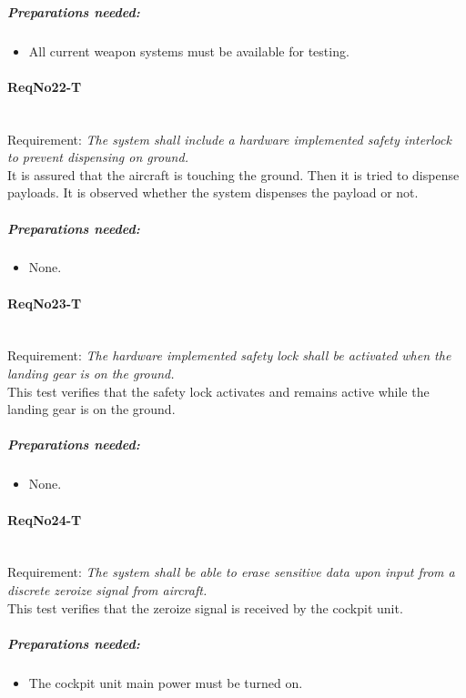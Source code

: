 	\subparagraph{Preparations needed:}
	\begin{itemize}
	\item All current weapon systems must be available for testing.
	\end{itemize} 
	

\paragraph{ReqNo22-T}\mbox{}\\ %
Requirement: \textit{The system shall include a hardware implemented safety interlock to prevent dispensing on ground.}
\\
It is assured that the aircraft is touching the ground. Then it is tried to dispense payloads. It is observed whether the system dispenses the payload or not.
\\
	\subparagraph{Preparations needed:}
	\begin{itemize}
	\item None.
	\end{itemize} 

\paragraph{ReqNo23-T}\mbox{}\\ %
Requirement: \textit{The hardware implemented safety lock shall be activated when the landing gear is on the ground.}
\\
This test verifies that the safety lock activates and remains active while the
landing gear is on the ground.
\\
	\subparagraph{Preparations needed:}
	\begin{itemize}
	\item None.
	\end{itemize} 

\paragraph{ReqNo24-T}\mbox{}\\ %
Requirement: \textit{The system shall be able to erase sensitive data upon input from a discrete zeroize signal from aircraft.}\\

This test verifies that the zeroize signal is received by the cockpit unit.
	\subparagraph{Preparations needed:}
	\begin{itemize}
	\item The cockpit unit main power must be turned on.
	\end{itemize}
	
